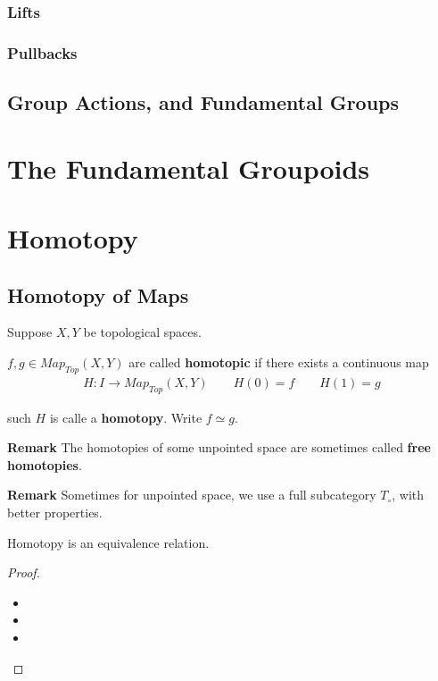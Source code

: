 \documentclass[Total.tex]{subfiles}
\begin{document}
	\subsection{Lifts}
	\subsection{Pullbacks}
	\section{Group Actions, and Fundamental Groups}
	
	\chapter{The Fundamental Groupoids}
	\chapter{Homotopy}
		\section{Homotopy of Maps}
			\begin{Def}
				Suppose $X,Y$ be topological spaces.
				
				$f,g\in Map_{Top}(X,Y)$ are called  \textbf{homotopic} if there exists a continuous map
				\begin{gather*}
					H:I\rightarrow Map_{Top}(X,Y)\qquad H(0)=f\qquad H(1)=g
				\end{gather*}
				
				such $H$ is calle a \textbf{homotopy}. Write $f\simeq g$.
				
				\textbf{Remark} The homotopies of some unpointed space are sometimes called \textbf{free homotopies}.
				
				\textbf{Remark} Sometimes for unpointed space, we use a full subcategory $T_\circ$, with better properties.
			\end{Def}
			
			\begin{lemma}
				Homotopy is an equivalence relation.
			\end{lemma}
			\begin{proof}
				\begin{itemize}
					\item 
					\item 
					\item 
				\end{itemize}
			\end{proof}
			
\end{document}
